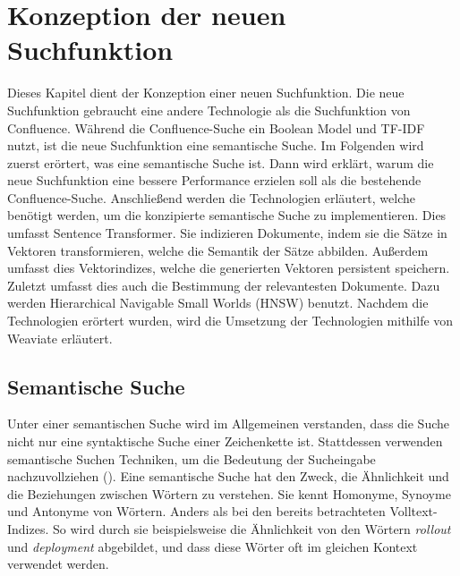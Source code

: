\chapter{Konzeption der neuen Suchfunktion}
\label{chap:konzeption-der-suchfunktion}
Dieses Kapitel dient der Konzeption einer neuen Suchfunktion.
Die neue Suchfunktion gebraucht eine andere Technologie als die Suchfunktion von Confluence.
Während die Confluence-Suche ein Boolean Model und TF-IDF nutzt, ist die neue Suchfunktion eine semantische Suche.
Im Folgenden wird zuerst erörtert, was eine semantische Suche ist.
Dann wird erklärt, warum die neue Suchfunktion eine bessere Performance erzielen soll als die bestehende Confluence-Suche.
Anschließend werden die Technologien erläutert, welche benötigt werden, um die konzipierte semantische Suche zu implementieren.
Dies umfasst Sentence Transformer.
Sie indizieren Dokumente, indem sie die Sätze in Vektoren transformieren, welche die Semantik der Sätze abbilden.
Außerdem umfasst dies Vektorindizes, welche die generierten Vektoren persistent speichern.
Zuletzt umfasst dies auch die Bestimmung der relevantesten Dokumente.
Dazu werden Hierarchical Navigable Small Worlds (HNSW) benutzt.
Nachdem die Technologien erörtert wurden, wird die Umsetzung der Technologien mithilfe von Weaviate erläutert.

\section{Semantische Suche}
Unter einer semantischen Suche wird im Allgemeinen verstanden, dass die Suche nicht nur eine syntaktische Suche einer Zeichenkette ist.
Stattdessen verwenden semantische Suchen Techniken, um die Bedeutung der Sucheingabe nachzuvollziehen (\cite{Dengel_2012}).
Eine semantische Suche hat den Zweck, die Ähnlichkeit und die Beziehungen zwischen Wörtern zu verstehen.
Sie kennt Homonyme, Synoyme und Antonyme von Wörtern.
Anders als bei den bereits betrachteten Volltext-Indizes. 
So wird durch sie beispielsweise die Ähnlichkeit von den Wörtern \textit{rollout} und \textit{deployment} abgebildet, und dass diese Wörter oft im gleichen Kontext verwendet werden.\\

